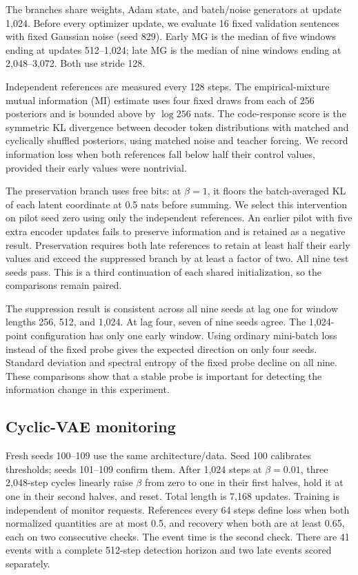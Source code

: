{The branches share weights, Adam state, and batch/noise generators at update 1,024. Before every optimizer update, we evaluate 16 fixed validation sentences with fixed Gaussian noise (seed 829). Early MG is the median of five windows ending at updates 512--1,024; late MG is the median of nine windows ending at 2,048--3,072. Both use stride 128.

Independent references are measured every 128 steps. The empirical-mixture mutual information (MI) estimate uses four fixed draws from each of 256 posteriors and is bounded above by $\log256$ nats. The code-response score is the symmetric KL divergence between decoder token distributions with matched and cyclically shuffled posteriors, using matched noise and teacher forcing. We record information loss when both references fall below half their control values, provided their early values were nontrivial.

The preservation branch uses free bits: at $\beta=1$, it floors the batch-averaged KL of each latent coordinate at 0.5 nats before summing. We select this intervention on pilot seed zero using only the independent references. An earlier pilot with five extra encoder updates fails to preserve information and is retained as a negative result. Preservation requires both late references to retain at least half their early values and exceed the suppressed branch by at least a factor of two. All nine test seeds pass. This is a third continuation of each shared initialization, so the comparisons remain paired.

\begin{table}[h]
\centering\small
\caption{}

\end{table}

The suppression result is consistent across all nine seeds at lag one for window lengths 256, 512, and 1,024. At lag four, seven of nine seeds agree. The 1,024-point configuration has only one early window. Using ordinary mini-batch loss instead of the fixed probe gives the expected direction on only four seeds. Standard deviation and spectral entropy of the fixed probe decline on all nine. These comparisons show that a stable probe is important for detecting the information change in this experiment.

\subsection{Cyclic-VAE monitoring}
Fresh seeds 100--109 use the same architecture/data. Seed 100 calibrates thresholds; seeds 101--109 confirm them. After 1,024 steps at $\beta=0.01$, three 2,048-step cycles linearly raise $\beta$ from zero to one in their first halves, hold it at one in their second halves, and reset. Total length is 7,168 updates. Training is independent of monitor requests. References every 64 steps define loss when both normalized quantities are at most 0.5, and recovery when both are at least 0.65, each on two consecutive checks. The event time is the second check. There are 41 events with a complete 512-step detection horizon and two late events scored separately.

}
